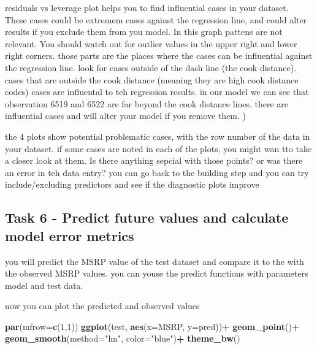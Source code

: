 \documentclass[
]{article}
\newenvironment{Shaded}{\begin{snugshade}}{\end{snugshade}}
\newcommand{\DataTypeTok}[1]{\textcolor[rgb]{0.13,0.29,0.53}{#1}}
\newcommand{\DecValTok}[1]{\textcolor[rgb]{0.00,0.00,0.81}{#1}}
\newcommand{\KeywordTok}[1]{\textcolor[rgb]{0.13,0.29,0.53}{\textbf{#1}}}
\newcommand{\NormalTok}[1]{#1}
\newcommand{\OperatorTok}[1]{\textcolor[rgb]{0.81,0.36,0.00}{\textbf{#1}}}
\newcommand{\StringTok}[1]{\textcolor[rgb]{0.31,0.60,0.02}{#1}}
\begin{document}
residuals vs leverage plot helps you to find influential cases in your
dataset.\\
These cases could be extremem cases against the regression line, and
could alter results if you exclude them from you model. In this graph
pattens are not relevant. You should watch out for outlier values in the
upper right and lower right corners. those parts are the places where
the cases can be influential against the regression line. look for cases
outside of the dash line (the cook distance). cases that are outside the
cook distance (meaning they are high cook distance codes) cases are
influental to teh regression results. in our model we can see that
observation 6519 and 6522 are far beyond the cook distance lines. there
are influential cases and will alter your model if you remove them. )

the 4 plots show potential problematic cases, with the row number of the
data in your dataset. if some cases are noted in each of the plots, you
might wan tto take a closer look at them. Is there anything sepcial with
those points? or was there an error in teh data entry? you can go back
to the building step and you can try include/excluding predictors and
see if the diagnostic plots improve

\hypertarget{task-6---predict-future-values-and-calculate-model-error-metrics}{%
\subsection{Task 6 - Predict future values and calculate model error
metrics}\label{task-6---predict-future-values-and-calculate-model-error-metrics}}

you will predict the MSRP value of the test dataset and compare it to
the with the observed MSRP values. you can youse the predict functions
with parameters model and test data.

\begin{Shaded}
\end{Shaded}

now you can plot the predicted and observed values

\begin{Shaded}
\begin{Highlighting}[]
\KeywordTok{par}\NormalTok{(}\DataTypeTok{mfrow=}\KeywordTok{c}\NormalTok{(}\DecValTok{1}\NormalTok{,}\DecValTok{1}\NormalTok{))}
\KeywordTok{ggplot}\NormalTok{(test, }\KeywordTok{aes}\NormalTok{(}\DataTypeTok{x=}\NormalTok{MSRP, }\DataTypeTok{y=}\NormalTok{pred))}\OperatorTok{+}
\StringTok{  }\KeywordTok{geom_point}\NormalTok{()}\OperatorTok{+}
\StringTok{  }\KeywordTok{geom_smooth}\NormalTok{(}\DataTypeTok{method=}\StringTok{"lm"}\NormalTok{, }\DataTypeTok{color=}\StringTok{"blue"}\NormalTok{)}\OperatorTok{+}
\StringTok{  }\KeywordTok{theme_bw}\NormalTok{()}
\end{Highlighting}
\end{Shaded}
\end{document}
